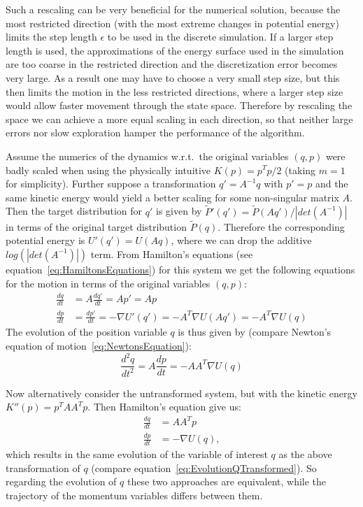 \documentclass[12pt]{scrartcl}
\begin{document}
Such a rescaling can be very beneficial for the numerical solution, because the most restricted direction (with the most extreme changes in potential energy) limits the step length $\epsilon$ to be used in the discrete simulation. If a larger step length is used, the approximations of the energy surface used in the simulation are too coarse in the restricted direction and the discretization error becomes very large. As a result one may have to choose a very small step size, but this then limits the motion in the less restricted directions, where a larger step size would allow faster movement through the state space. Therefore by rescaling the space we can achieve a more equal scaling in each direction, so that neither large errors nor slow exploration hamper the performance of the algorithm.

Assume the numerics of the dynamics w.r.t.\ the original variables $(q, p)$ were badly scaled when using the physically intuitive $K(p) = p^T p/2$ (taking $m=1$ for simplicity). Further suppose a transformation $q' = A^{-1} q$ with $p'=p$ and the same kinetic energy would yield a better scaling for some non-singular matrix $A$. Then the target distribution for $q'$ is given by $\tilde{P}'(q') = \tilde{P}(Aq')/|det(A^{-1})|$ in terms of the original target distribution $\tilde{P}(q)$. Therefore the corresponding potential energy is $U'(q') = U(Aq)$, where we can drop the additive $log(|det(A^{-1})|)$ term. From Hamilton's equations (see equation~\eqref{eq:HamiltonsEquations}) for this system we get the following equations for the motion in terms of the original variables $(q, p)$:
\begin{equation}
\begin{split}
\frac{dq}{dt} &= A \frac{dq'}{dt} = Ap' = Ap \\
\frac{dp}{dt} &= \frac{dp'}{dt} = - \nabla U'(q') = - A^T \nabla U(Aq') = - A^T \nabla U(q)
\end{split}
\end{equation}
The evolution of the position variable $q$ is thus given by (compare Newton's equation of motion~\eqref{eq:NewtonsEquation}):
\begin{equation} \label{eq:EvolutionQTransformed}
\frac{d^2q}{dt^2} = A \frac{dp}{dt} = - A A^T \nabla U(q)
\end{equation}

Now alternatively consider the untransformed system, but with the kinetic energy $K''(p) = p^T A A^T p$. Then Hamilton's equation give us:
\begin{equation}
\begin{split}
\frac{dq}{dt} &= A A^T p \\
\frac{dp}{dt} &= - \nabla U(q),
\end{split}
\end{equation}
which results in the same evolution of the variable of interest $q$ as the above transformation of $q$ (compare equation~\eqref{eq:EvolutionQTransformed}). So regarding the evolution of $q$ these two approaches are equivalent, while the trajectory of the momentum variables differs between them.
\end{document}
